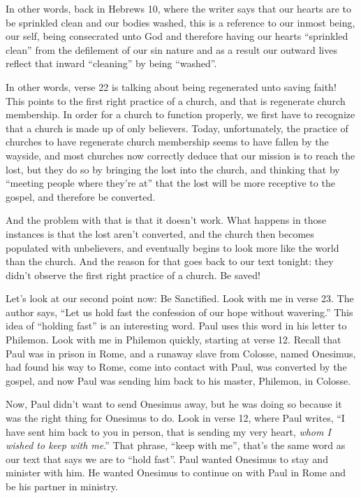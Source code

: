 \documentclass[letterpaper, 12pt]{article}
\begin{document}
    In other words, back in Hebrews 10, where the writer says that our
    hearts are to be sprinkled clean and our bodies washed, this is a
    reference to our inmost being, our self, being consecrated unto God
    and therefore having our hearts ``sprinkled clean'' from the
    defilement of our sin nature and as a result our outward lives
    reflect that inward ``cleaning'' by being ``washed''.

    In other words, verse 22 is talking about being regenerated unto
    saving faith! This points to the first right practice of a church,
    and that is regenerate church membership. In order for a church to
    function properly, we first have to recognize that a church is made
    up of only believers. Today, unfortunately, the practice of churches
    to have regenerate church membership seems to have fallen by the
    wayside, and most churches now correctly deduce that our mission is
    to reach the lost, but they do so by bringing the lost into the
    church, and thinking that by ``meeting people where they're at''
    that the lost will be more receptive to the gospel, and therefore be
    converted.

    And the problem with that is that it doesn't work. What happens in
    those instances is that the lost aren't converted, and the church
    then becomes populated with unbelievers, and eventually begins to
    look more like the world than the church. And the reason for that
    goes back to our text tonight: they didn't observe the first
    right practice of a church. Be saved!

    Let's look at our second point now: Be Sanctified. Look with me in
    verse 23. The author says, ``Let us hold fast the confession of our
    hope without wavering.'' This idea of ``holding fast'' is an
    interesting word. Paul uses this word in his letter to Philemon.
    Look with me in Philemon quickly, starting at verse 12. Recall that
    Paul was in prison in Rome, and a runaway slave from Colosse, named
    Onesimus, had found his way to Rome, come into contact with Paul,
    was converted by the gospel, and now Paul was sending him back to
    his master, Philemon, in Colosse. 

    Now, Paul didn't want to send Onesimus away, but he was doing so
    because it was the right thing for Onesimus to do. Look in verse 12,
    where Paul writes, ``I have sent him back to you in person, that is
    sending my very heart, \emph{whom I wished to keep with me}.'' That
    phrase, ``keep with me'', that's the same word as our text that says
    we are to ``hold fast''. Paul wanted Onesimus to stay and minister
    with him. He wanted Onesimus to continue on with Paul in Rome and be
    his partner in ministry.
\end{document}
